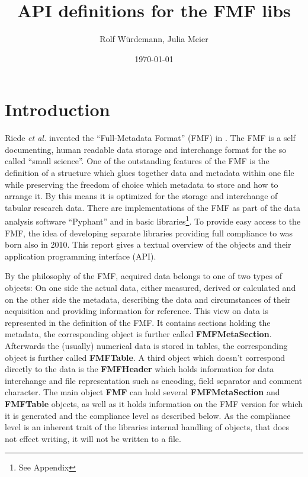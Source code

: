 \documentclass[10pt,utf8, mainlanguage=english]{ufcd-info}
\author{Rolf Würdemann, Julia Meier}
\title{API definitions for the FMF libs}
\date{\today}
\newcommand{\fmfobj}[1]{{\textbf{\textsf{#1}}}}
\begin{document}

\maketitle
\thispagestyle{empty}

\section{Introduction}

Riede {\sl et al.} invented the \enquote{Full-Metadata Format} (FMF) in \cite{RiedeCPC181_2010}. The FMF is a self documenting, human readable data storage and interchange format for the so called \enquote{small science}. One of the outstanding features of the FMF is the definition of a structure which glues together data and metadata within one file while preserving the freedom of choice which metadata to store and how to arrange it. By this means it is optimized for the storage and interchange of tabular research data. There are implementations of the FMF as part of the data analysis software \enquote{Pyphant} and in basic libraries\footnote{See Appendix}. To provide easy access to the FMF, the idea of developing separate libraries providing full compliance to \cite{RiedeCPC181_2010} was born also in 2010. This report gives a textual overview of the objects and their application programming interface (API).

By the philosophy of the FMF, acquired data belongs to one of two types of objects: On one side the actual data, either measured, derived or calculated and on the other side the metadata, describing the data and circumstances of their acquisition and providing information for reference. This view on data is represented in the definition of the FMF. It contains sections holding the metadata, the corresponding object is further called \fmfobj{FMFMetaSection}. Afterwards the (usually) numerical data is stored in tables, the corresponding object is further called \fmfobj{FMFTable}. A third object which doesn't correspond directly to the data is the \fmfobj{FMFHeader} which holds information for data interchange and file representation such as encoding, field separator and comment character. The main object \fmfobj{FMF} can hold several \fmfobj{FMFMetaSection} and \fmfobj{FMFTable} objects, as well as it holds information on the FMF version for which it is generated and the compliance level as described below. As the compliance level is an inherent trait of the libraries internal handling of objects, that does not effect writing, it will not be written to a file.
\end{document}
